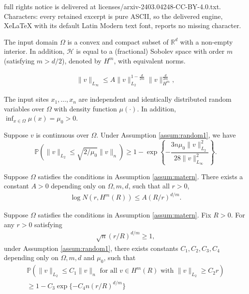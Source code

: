 \documentclass[10pt,a4paper]{amsart}
\begin{document}
full rights notice is delivered at licenses/arxiv-2403.04248-CC-BY-4.0.txt. Characters: every retained excerpt is pure ASCII, so the delivered engine, XeLaTeX with its default Latin Modern text font, reports no missing character.
\begin{assumption}\label{assum:matern}
    The input domain $\Omega$ is a convex and compact subset of $\mathbb{R}^d$ with a non-empty interior.
    In addition, $\mathcal{H}$ is equal to a (fractional) Sobolev space with order $m$ (satisfying $m>d/2$), denoted by $H^m$, with equivalent norms. 
\end{assumption}

\begin{eqnarray}\label{interpolation}
    \|v\|_{L_\infty}\leq A\|v\|^{1-\frac{d}{2m}}_{L_2}\|v\|^{\frac{d}{2m}}_{H^m},
\end{eqnarray}

\begin{assumption}\label{assum:random1}
    The input sites $x_1,\ldots,x_n$ are independent and identically distributed random variables over $\Omega$ with density function $\mu(\cdot)$. In addition, $\inf_{x\in\Omega}\mu(x)=\mu_0>0$.
\end{assumption}

\begin{lemma}\label{lemma:bernstein}
    Suppose $v$ is continuous over $\Omega$. Under Assumption \ref{assum:random1}, we have
    \[\mathbb{P}(\|v\|_{L_2}\leq \sqrt{2/\mu_0}\|v\|_n)\geq 1- \exp\left\{-\frac{3n\mu_0\|v\|^2_{L_2}}{28\|v\|^2_{L_\infty}}\right\}.\]
\end{lemma}

\begin{proposition}
Suppose $\Omega$ satisfies the conditions in Assumption \ref{assum:matern}.
    There exists a constant $A>0$ depending only on $\Omega,m,d$, such that all $r>0$,
    \begin{eqnarray}\label{entropy}
        \log N(r,H^m(R))\leq A(R/r)^{d/m}.
    \end{eqnarray}
\end{proposition}

\begin{lemma}\label{lemma:step2}
Suppose $\Omega$ satisfies the conditions in Assumption \ref{assum:matern}.
    Fix $R>0$. For any $r>0$ satisfying 
    \begin{eqnarray}
        \sqrt{n}(r/R)^{d/m}\geq 1,\label{epsilon}
    \end{eqnarray}
    under Assumption \ref{assum:random1},
   there exists constants $C_1,C_2,C_3,C_4$ depending only on $\Omega,m,d$ and $\mu_0$, such that
   \begin{eqnarray*}
       \mathbb{P}\left(\|v\|_{L_2}\leq C_1 \|v\|_n \text{ for all } v\in H^m(R) \text{ with } \|v\|_{L_2}\geq C_2r\right)\\\geq 1-C_3\exp\{-C_4n(r/R)^{d/m}\}
   \end{eqnarray*}
\end{lemma}
\end{document}
